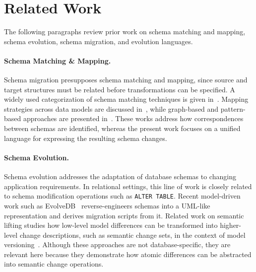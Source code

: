 \documentclass{llncs}
\begin{document}
\section{Related Work}
\label{sec:related-work}

The following paragraphs review prior work on schema matching and mapping, schema evolution, schema migration, and evolution languages.


\paragraph{Schema Matching \& Mapping.}
Schema migration presupposes schema matching and mapping, since source and target structures must be related before transformations can be specified. A widely used categorization of schema matching techniques is given in~\cite{DBLP:journals/vldb/RahmB01}. Mapping strategies across data models are discussed in~\cite{DBLP:conf/idt2/CeresnakDMK21,DBLP:journals/sp/AftabIABA20,DBLP:journals/kais/BansalSA24}, while graph-based and pattern-based approaches are presented in~\cite{DBLP:journals/dpd/DingSW20,DBLP:journals/pvldb/MartensNPRVV23,DBLP:conf/icdt/Barcelo0R13,DBLP:conf/pods/FrancisL17}. These works address how correspondences between schemas are identified, whereas the present work focuses on a unified language for expressing the resulting schema changes.


\paragraph{Schema Evolution.}
Schema evolution addresses the adaptation of database schemas to changing application requirements. In relational settings, this line of work is closely related to schema modification operations such as \texttt{ALTER TABLE}. Recent model-driven work such as EvolveDB~\cite{eckwert2025evolvedb} reverse-engineers schemas into a UML-like representation and derives migration scripts from it. Related work on semantic lifting studies how low-level model differences can be transformed into higher-level change descriptions, such as semantic change sets, in the context of model versioning~\cite{DBLP:conf/kbse/KehrerKT11,DBLP:conf/icsm/KehrerKOS12}. Although these approaches are not database-specific, they are relevant here because they demonstrate how atomic differences can be abstracted into semantic change operations.
\end{document}
